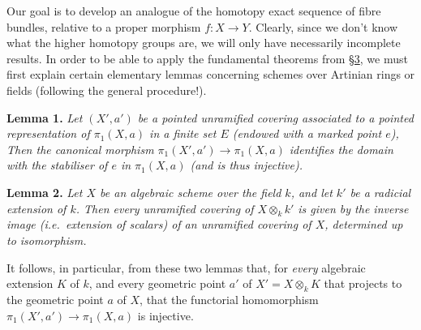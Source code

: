 \documentclass{article}
\newenvironment{itenv}[1]
  {\phantomsection\par\smallskip\noindent\textbf{#1.}\itshape}
  {\par\smallskip}
\theoremstyle{definition}
\theoremstyle{definition}
\theoremstyle{definition}
\theoremstyle{definition}
\theoremstyle{remark}
\begin{document}
Our goal is to develop an analogue of the homotopy exact sequence of fibre bundles, relative to a proper morphism \(f\colon X\to Y\).
Clearly, since we don't know what the higher homotopy groups are, we will only have necessarily incomplete results.
In order to be able to apply the fundamental theorems from \protect\hyperlink{fga-2-section-3}{§3}, we must first explain certain elementary lemmas concerning schemes over Artinian rings or fields (following the general procedure!).

\leavevmode{}%
\begin{itenv}{Lemma 1}
Let \((X',a')\) be a pointed unramified covering associated to a pointed representation of \(\pi_1(X,a)\) in a finite set \(E\) (endowed with a marked point \(e\)),
Then the canonical morphism \(\pi_1(X',a')\to\pi_1(X,a)\) identifies the domain with the stabiliser of \(e\) in \(\pi_1(X,a)\) (and is thus injective).

\end{itenv}

\leavevmode{}%
\begin{itenv}{Lemma 2}
Let \(X\) be an algebraic scheme over the field \(k\), and let \(k'\) be a radicial extension of \(k\).
Then every unramified covering of \(X\otimes_kk'\) is given by the inverse image (i.e.~extension of scalars) of an unramified covering of \(X\), determined up to isomorphism.

\end{itenv}

It follows, in particular, from these two lemmas that, for \emph{every} algebraic extension \(K\) of \(k\), and every geometric point \(a'\) of \(X'=X\otimes_kK\) that projects to the geometric point \(a\) of \(X\), that the functorial homomorphism \(\pi_1(X',a')\to\pi_1(X,a)\) is injective.
\end{document}
